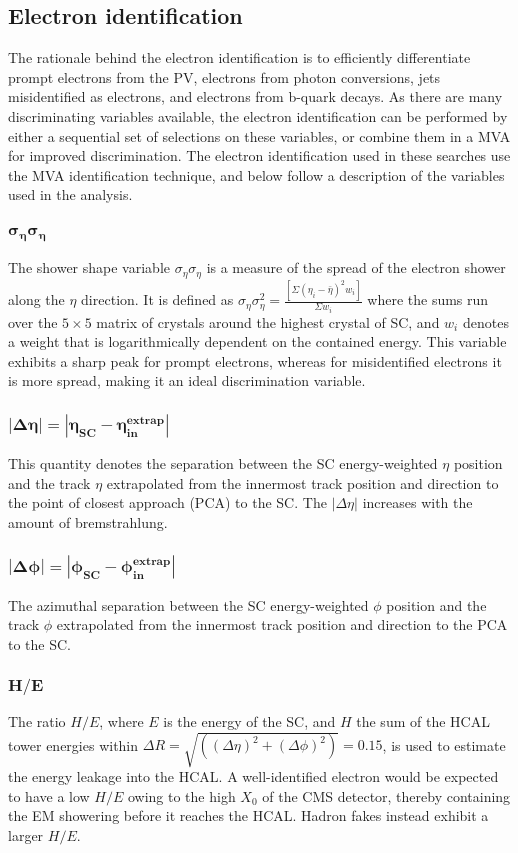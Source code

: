 \subsection*{Electron identification}
\noindent\justify
The rationale behind the electron identification is to efficiently differentiate prompt electrons from the PV, electrons from photon conversions, jets misidentified as electrons, and electrons from b-quark decays.  
As there are many discriminating variables available, the electron identification can be performed by either a sequential set of selections on these variables, or combine them in a MVA for improved discrimination.
The electron identification used in these searches use the MVA identification technique, and below follow a description of the variables used in the analysis. 
\subsubsection*{$\bm{\sigma_{\eta}\sigma_{\eta}}$}
\noindent\justify 
The shower shape variable $\sigma_{\eta}\sigma_{\eta}$ is a measure of the spread of the electron shower along the $\eta$ direction.
It is defined as $\sigma_{\eta}\sigma_{\eta}^{2}=\frac{[\Sigma (\eta_i-\bar{\eta})^{2}w_i]}{\Sigma w_i}$ where the sums run over the $5\times5$ matrix of crystals around the highest \ET crystal of SC, and $w_i$ denotes a weight that is logarithmically dependent on the contained energy.
This variable exhibits a sharp peak for prompt electrons, whereas for misidentified electrons it is more spread, making it an ideal discrimination variable.  
\subsubsection*{$\bm{|\Delta \eta| = |\eta_{SC}-\eta_{in}^{extrap}|}$}
\noindent\justify 
This quantity denotes the separation between the SC energy-weighted $\eta$ position and the track $\eta$ extrapolated from the innermost track position and direction to the point of closest approach (PCA) to the SC.
The $|\Delta \eta|$ increases with the amount of bremstrahlung. 
\subsubsection*{$\bm{|\Delta \phi| = |\phi_{SC}-\phi_{in}^{extrap}|}$}
\noindent\justify 
The azimuthal separation between the SC energy-weighted $\phi$ position and the track $\phi$ extrapolated from the innermost track position and direction to the PCA to the SC.
\subsubsection*{$\bm{H/E}$}
\noindent\justify  
The ratio $H/E$, where $E$ is the energy of the SC, and $H$ the sum of the HCAL tower energies within $\Delta R = \sqrt{((\Delta \eta )^{2}+ (\Delta \phi )^{2})} = 0.15$, is used to estimate the energy leakage into the HCAL. 
A well-identified electron would be expected to have a low $H/E$ owing to the high $X_0$ of the CMS detector, thereby containing the EM showering before it reaches the HCAL. 
Hadron fakes instead exhibit a larger $H/E$. 
